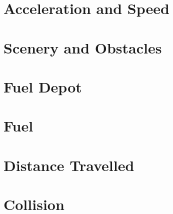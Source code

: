 \documentclass{article}
\begin{document}
\section{Acceleration and Speed}

\clearpage

\section{Scenery and Obstacles}

\clearpage

\section{Fuel Depot}

\clearpage

\section{Fuel}

\clearpage


\section{Distance Travelled}

\clearpage


\section{Collision}

\clearpage
\end{document}
